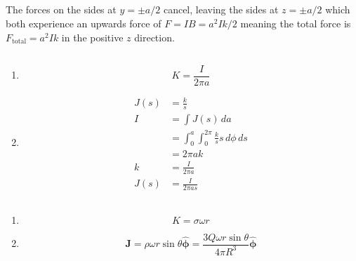 \documentclass{article}
\renewcommand{\vec}[1]{\boldsymbol{\mathbf{#1}}}
\newcommand{\uvec}[1]{\hat{\vec{#1}}}
\begin{document}
\subsection{}

The forces on the sides at $y = \pm a / 2$ cancel, leaving the sides at $z = \pm a / 2$ which both experience an upwards force of $F = I B = a^2 I k / 2$ meaning the total force is $F_\text{total} = a^2 I k$ in the positive $z$ direction.

\subsection{}

\begin{enumerate}
  \item \[K = \frac{I}{2 \pi a}\]

  \item

        \begin{align*}
          J(s) & = \frac{k}{s}                                          \\
          I    & = \int J(s) \,d a                                      \\
               & = \int_0^a \int_0^{2 \pi} \frac{k}{s} s \,d \phi \,d s \\
               & = 2 \pi a k                                            \\
          k    & = \frac{I}{2 \pi a}                                    \\
          J(s) & = \frac{I}{2 \pi a s}
        \end{align*}
\end{enumerate}

\subsection{}

\begin{enumerate}
  \item \[K = \sigma \omega r\]

  \item \[\vec{J} = \rho \omega r \sin \theta \uvec{\phi} = \frac{3 Q \omega r \sin \theta}{4 \pi R^3} \uvec{\phi}\]
\end{enumerate}

\setcounter{subsection}{7}
\subsection{}
\end{document}
